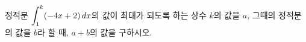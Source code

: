 정적분 $\displaystyle\int_{1}^{k}(-4x+2)\mkern3mu dx$의 값이 최대가 되도록 하는 상수 $k$의 값을 $a$, 그때의 정적분의 값을 $b$라 할 때, $a+b$의 값을 구하시오.

